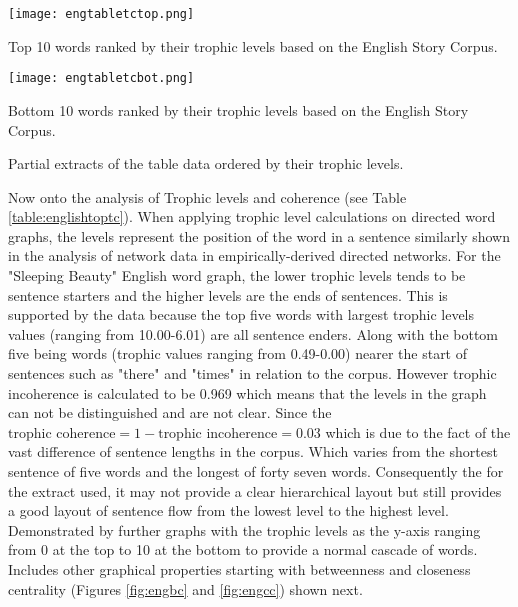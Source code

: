 \begin{table}[H]
\centering
\begin{subtable}{.45\textwidth}
	\centering
	\texttt{[image: engtabletctop.png]}
	\caption{Top 10 words ranked by their trophic levels based on the English Story Corpus.}
	\label{table:}
\end{subtable}
\hfill
\begin{subtable}{.45\textwidth}
	\centering
	\texttt{[image: engtabletcbot.png]}
	\caption{Bottom 10 words ranked by their trophic levels based on the English Story Corpus.}
	\label{table:englishtoptc}
\end{subtable}
\caption{Partial extracts of the table data ordered by their trophic levels.}
\end{table}

Now onto the analysis of Trophic levels and coherence (see Table \ref{table:englishtoptc}). When applying trophic level calculations on directed word graphs, the levels represent the position of the word in a sentence similarly shown in the analysis of network data in empirically-derived directed networks\cite{johnson2017looplessness}. For the "Sleeping Beauty" English word graph, the lower trophic levels tends to be sentence starters and the higher levels are the ends of sentences. This is supported by the data because the top five words with largest trophic levels values (ranging from 10.00-6.01) are all sentence enders. Along with the bottom five being words (trophic values ranging from 0.49-0.00) nearer the start of sentences such as "there" and "times" in relation to the corpus. However trophic incoherence is calculated to be 0.969 which means that the levels in the graph can not be distinguished and are not clear. Since the $\text{trophic coherence} = 1 - \text{trophic incoherence} = 0.03$ which is due to the fact of the vast difference of sentence lengths in the corpus. Which varies from the shortest sentence of five words and the longest of forty seven words. Consequently the for the extract used, it may not provide a clear hierarchical layout but still provides a good layout of sentence flow from the lowest level to the highest level. Demonstrated by further graphs with the trophic levels as the y-axis ranging from 0 at the top to 10 at the bottom to provide a normal cascade of words. Includes other graphical properties starting with betweenness and closeness centrality (Figures \ref{fig:engbc} and \ref{fig:engcc}) shown next.

